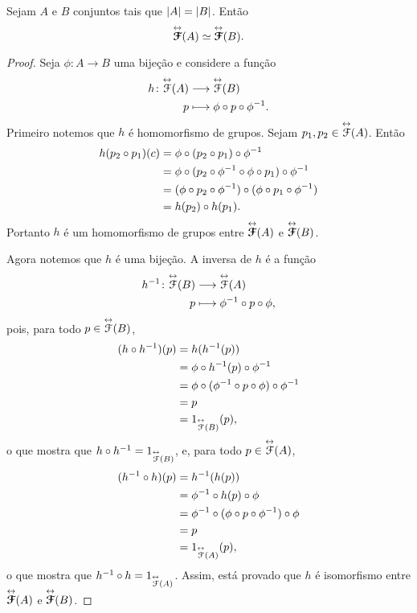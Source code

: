 \begin{proposition}
	Sejam $A$ e $B$ conjuntos tais que $\left\lvert{A}\right\rvert = \left\lvert{B}\right\rvert$. Então
	\begin{equation*}
	\overset{\leftrightarrow}{\bm{\mathcal{F}}}(A) \simeq \overset{\leftrightarrow}{\bm{\mathcal{F}}}(B).
	\end{equation*}
\end{proposition}
\begin{proof}
	Seja $\phi: A \to B$ uma bijeção e considere a função
	\begin{align*}
	{h}\colon {\overset{\leftrightarrow}{\mathcal{F}}(A)} &\longrightarrow {\overset{\leftrightarrow}{\mathcal{F}}(B)} \\{p} &\longmapsto \phi \circ p \circ \phi^{-1}.
	\end{align*}
Primeiro notemos que $h$ é homomorfismo de grupos. Sejam $p_1,p_2 \in \overset{\leftrightarrow}{\mathcal{F}}(A)$. Então
	\begin{align*}
	h(p_2 \circ p_1)(c) &= \phi \circ (p_2 \circ p_1) \circ \phi^{-1} \\
			&= \phi \circ (p_2 \circ \phi^{-1} \circ \phi \circ p_1) \circ \phi^{-1} \\
			&= (\phi \circ p_2 \circ \phi^{-1}) \circ (\phi \circ p_1 \circ \phi^{-1}) \\
			&= h(p_2) \circ h(p_1).
	\end{align*}
Portanto $h$ é um homomorfismo de grupos entre $\overset{\leftrightarrow}{\bm{\mathcal{F}}}(A)$ e $\overset{\leftrightarrow}{\bm{\mathcal{F}}}(B)$.

Agora notemos que $h$ é uma bijeção. A inversa de $h$ é a função
	\begin{align*}
	{h^{-1}}\colon {\overset{\leftrightarrow}{\mathcal{F}}(B)} &\longrightarrow {\overset{\leftrightarrow}{\mathcal{F}}(A)} \\{p} &\longmapsto \phi^{-1} \circ p \circ \phi,
	\end{align*}
pois, para todo $p \in \overset{\leftrightarrow}{\mathcal{F}}(B)$,
	\begin{align*}
	(h \circ h^{-1}) (p) &= h (h^{-1}(p)) \\
			&= \phi \circ h^{-1}(p) \circ \phi^{-1} \\
			&= \phi \circ (\phi^{-1} \circ p \circ \phi) \circ \phi^{-1} \\
			&= p \\
			&= 1_{\overset{\leftrightarrow}{\mathcal{F}}(B)}(p),
	\end{align*}
o que mostra que $h \circ h^{-1} = 1_{\overset{\leftrightarrow}{\mathcal{F}}(B)}$, e, para todo $p \in \overset{\leftrightarrow}{\mathcal{F}}(A)$,
	\begin{align*}
	(h^{-1} \circ h) (p) &= h^{-1} (h(p)) \\
			&= \phi^{-1} \circ h(p) \circ \phi \\
			&= \phi^{-1} \circ (\phi \circ p \circ \phi^{-1}) \circ \phi \\
			&= p \\
			&= 1_{\overset{\leftrightarrow}{\mathcal{F}}(A)}(p),
	\end{align*}
o que mostra que $h^{-1} \circ h = 1_{\overset{\leftrightarrow}{\mathcal{F}}(A)}$. Assim, está provado que $h$ é isomorfismo entre $\overset{\leftrightarrow}{\bm{\mathcal{F}}}(A)$ e $\overset{\leftrightarrow}{\bm{\mathcal{F}}}(B)$.
\end{proof}

